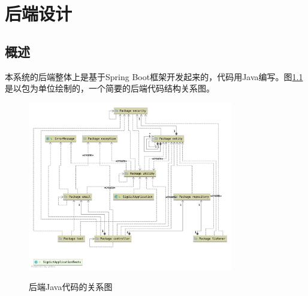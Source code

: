 
\chapter{后端设计}

\section{概述}

本系统的后端整体上是基于Spring Boot框架开发起来的，代码用Java编写。图\ref{fig:package}是以包为单位绘制的，一个简要的后端代码结构关系图。

\begin{figure}[!htb]
	\centering
	\includegraphics[width=0.8\textwidth]
	{figures/package.png}\\
	\caption{后端Java代码的关系图}
	\label{fig:package}
\end{figure}

